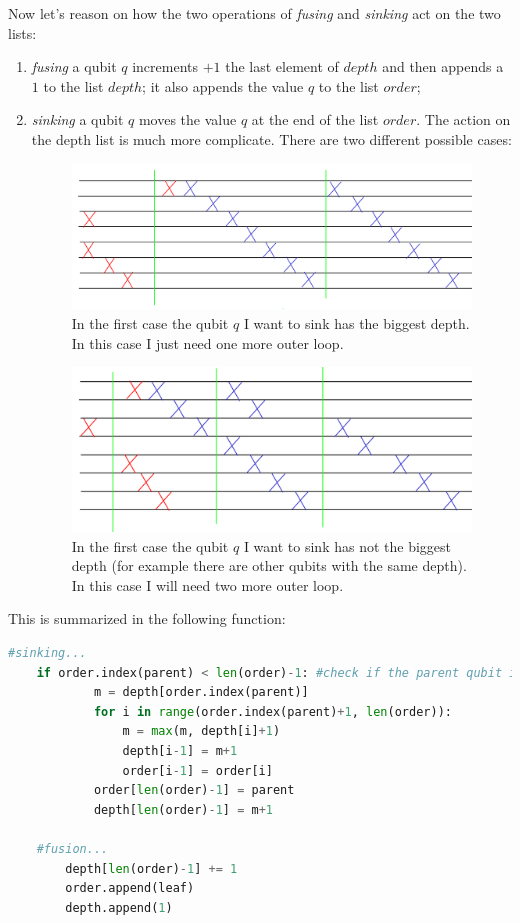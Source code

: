 \documentclass{article}
\begin{document}
Now let's reason on how the two operations of \textit{fusing} and \textit{sinking} act on the two lists:
\begin{enumerate}
    \item \textit{fusing} a qubit $q$ increments $+1$ the last element of $depth$ and then appends a $1$ to the list $depth$; it also appends the value $q$ to the list $order$;
    \item \textit{sinking} a qubit $q$ moves the value $q$ at the end of the list $order$. The action on the depth list is much more complicate. There are two different possible cases:
    \begin{figure}[H]
        \includegraphics[width=\textwidth]{pics/case_1.png}
        \caption{In the first case the qubit $q$ I want to sink has the biggest depth. In this case I just need one more outer loop.}
    \end{figure}
    \begin{figure}[H]
        \includegraphics[width=\textwidth]{pics/case_2.png}
        \caption{In the first case the qubit $q$ I want to sink has not the biggest depth (for example there are other qubits with the same depth). In this case I will need two more outer loop.}
    \end{figure}
    
\end{enumerate}

This is summarized in the following function:
\begin{lstlisting}[language=Python]
    #sinking...
    if order.index(parent) < len(order)-1: #check if the parent qubit isn't already at the end of the circuit
            m = depth[order.index(parent)]
            for i in range(order.index(parent)+1, len(order)):
                m = max(m, depth[i]+1)
                depth[i-1] = m+1
                order[i-1] = order[i]
            order[len(order)-1] = parent
            depth[len(order)-1] = m+1

	#fusion...
        depth[len(order)-1] += 1
        order.append(leaf)
        depth.append(1)
\end{lstlisting}
\end{document}

